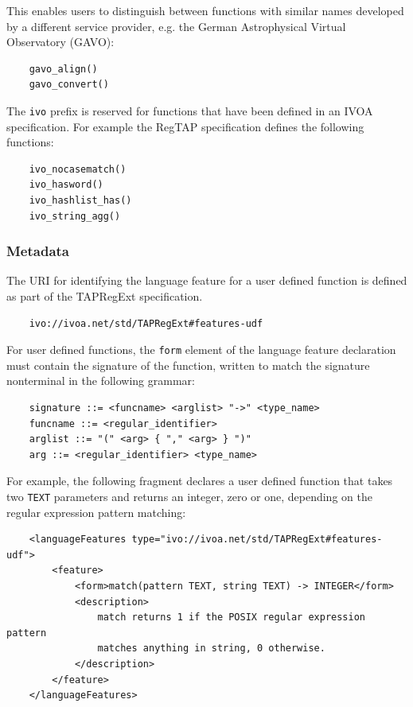 \documentclass[11pt,a4paper]{ivoa}
\newcommand{\RegTAPspec}{RegTAP specification\xspace}
\newcommand{\TAPRegExtSpec}{TAPRegExt specification\xspace}
\begin{document}
This enables users to distinguish between functions with similar names developed
by a different service provider, e.g. the German Astrophysical Virtual
Observatory (GAVO):
\begin{verbatim}
    gavo_align()
    gavo_convert()
\end{verbatim}

The \verb:ivo: prefix is reserved for functions that have been defined
in an IVOA specification. For example the \RegTAPspec defines the following
functions:
\begin{verbatim}
    ivo_nocasematch()
    ivo_hasword()
    ivo_hashlist_has()
    ivo_string_agg()
\end{verbatim}


\subsubsection{Metadata}
\label{sec:user.metadata}

The URI for identifying the language feature for a user defined function
is defined as part of the \TAPRegExtSpec.

\begin{verbatim}
    ivo://ivoa.net/std/TAPRegExt#features-udf
\end{verbatim}

For user defined functions, the \verb:form: element of the language feature
declaration must contain the signature of the function, written to match
the signature nonterminal in the following grammar:
\begin{verbatim}
    signature ::= <funcname> <arglist> "->" <type_name>
    funcname ::= <regular_identifier>
    arglist ::= "(" <arg> { "," <arg> } ")"
    arg ::= <regular_identifier> <type_name>
\end{verbatim}

For example, the following fragment declares a user defined function that
takes two \verb:TEXT: parameters and returns an integer, zero or one,
depending on the regular expression pattern matching:
\begin{verbatim}
    <languageFeatures type="ivo://ivoa.net/std/TAPRegExt#features-udf">
        <feature>
            <form>match(pattern TEXT, string TEXT) -> INTEGER</form>
            <description>
                match returns 1 if the POSIX regular expression pattern
                matches anything in string, 0 otherwise.
            </description>
        </feature>
    </languageFeatures>
\end{verbatim}
\end{document}
